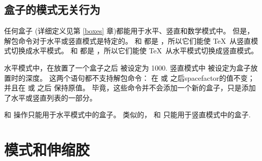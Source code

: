 \documentclass{book}
\begin{document}
\subsection{盒子的模式无关行为}

任何盒子  (详细定义见第 \ref{boxes} 章)都能用于水平、竖直和数学模式中。
但是，解包命令对于水平或竖直模式是特定的。
 和  都是 ，所以它们能使 \TeX\ 从竖直模式切换成水平模式。
 和  都是 ，所以它们能使 \TeX\ 从水平模式切换成竖直模式。

水平模式中，在放置了一个盒子之后  被设定为 1000.
竖直模式中  被设定为盒子放置时的深度。
这两个语句都不支持解包命令：
在  或  之后spacefactor的值不变；
并且在  或  之后  保持原值。
毕竟，这些命令并不会添加一个新的盒子，只是添加了水平或竖直列表的一部分。

 和  操作只能用于水平模式中的盒子。
类似的， 和  只能用于竖直模式中的盒子.


\section{模式和伸缩胶}
\end{document}
